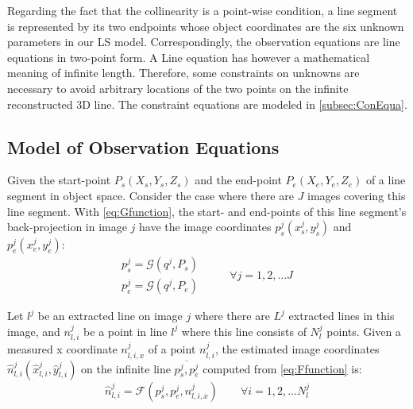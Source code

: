 Regarding the fact that the collinearity is a point-wise condition, a line segment is represented by its two endpoints whose object coordinates are the six unknown parameters in our LS model. Correspondingly, the observation equations are line equations in two-point form. A Line equation has however a mathematical meaning of infinite length. Therefore, some constraints on unknowns are necessary to avoid arbitrary locations of the two points on the infinite reconstructed 3D line. The constraint equations are modeled in \cref{subsec:ConEqua}.






\subsection{Model of Observation Equations}
\label{subsec:ObsEqua}

Given the start-point $P_s(X_s,Y_s,Z_s)$ and the end-point $P_e(X_e,Y_e,Z_e)$ of a line segment in object space. Consider the case where there are $J$ images covering this line segment. With \cref{eq:Gfunction}, the start- and end-points of this line segment's back-projection in image $j$ have the image coordinates $p^j_s(x^j_s,y^j_s)$ and $p^j_e(x^j_e,y^j_e)$:
\begin{equation} \label{eq:obsmodel-collinearity}
\begin{split}
p^j_s = \mathcal{G}(q^j,P_s)\\
p^j_e = \mathcal{G}(q^j,P_e)
\end{split}
\qquad
\begin{split}
\forall j=1,2,...J
\end{split}
\end{equation}

Let $l^j$ be an extracted line on image $j$ where there are $L^j$ extracted lines in this image, and $n^j_{l,i}$ be a point in line $l^j$ where this line consists of $N^j_l$ points. Given a measured x coordinate $n^j_{l,i,x}$ of a point $n^j_{l,i}$, the estimated image coordinates $\hat{n}^j_{l,i}(\hat{x}^j_{l,i},\hat{y}^j_{l,i})$ on the infinite line $\overline{p^j_s,p^j_e}$ computed from \cref{eq:Ffunction} is:
\begin{equation} \label{eq:obsmodel-linefitting}
\hat{n}^j_{l,i} = \mathcal{F}(p^j_s,p^j_e,n^j_{l,i,x})
\qquad
\forall i=1,2,...N^j_l
\end{equation}

